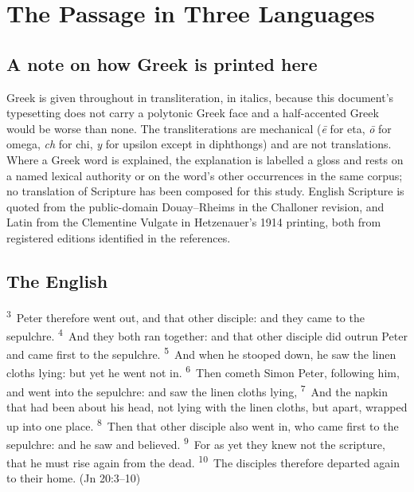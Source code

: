 \section{The Passage in Three Languages}

\subsection{A note on how Greek is printed here}

Greek is given throughout in transliteration, in italics, because this
document's typesetting does not carry a polytonic Greek face and a
half-accented Greek would be worse than none. The transliterations are
mechanical (\emph{\=e} for eta, \emph{\=o} for omega, \emph{ch} for chi,
\emph{y} for upsilon except in diphthongs) and are not translations. Where a
Greek word is explained, the explanation is labelled a gloss and rests on a
named lexical authority or on the word's other occurrences in the same corpus;
no translation of Scripture has been composed for this study. English
Scripture is quoted from the public-domain Douay--Rheims in the Challoner
revision, and Latin from the Clementine Vulgate in Hetzenauer's 1914 printing,
both from registered editions identified in the references.

\subsection{The English}

\begin{studyframe}\small
\textsuperscript{3}~Peter therefore went out, and that other disciple: and
they came to the sepulchre. \textsuperscript{4}~And they both ran together:
and that other disciple did outrun Peter and came first to the sepulchre.
\textsuperscript{5}~And when he stooped down, he saw the linen cloths lying:
but yet he went not in. \textsuperscript{6}~Then cometh Simon Peter, following
him, and went into the sepulchre: and saw the linen cloths lying,
\textsuperscript{7}~And the napkin that had been about his head, not lying with
the linen cloths, but apart, wrapped up into one place.
\textsuperscript{8}~Then that other disciple also went in, who came first to
the sepulchre: and he saw and believed. \textsuperscript{9}~For as yet they
knew not the scripture, that he must rise again from the dead.
\textsuperscript{10}~The disciples therefore departed again to their home.
(Jn 20:3--10)
\end{studyframe}

